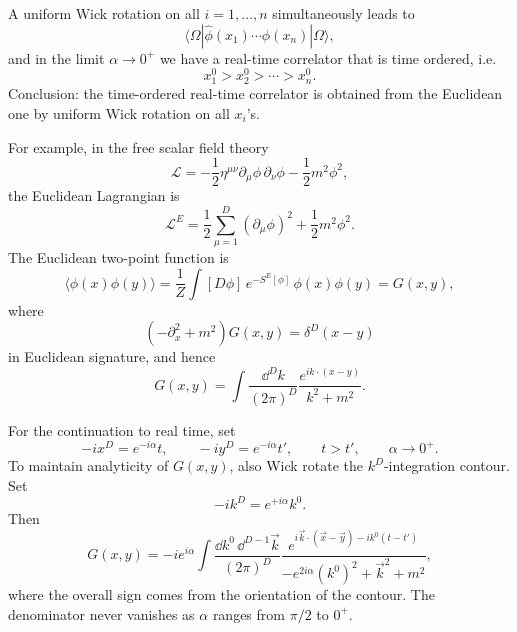 \begin{center}
\end{center}

A uniform Wick rotation on all \(i=1,\ldots,n\) simultaneously leads to
\[
  \langle\Omega|
  \hat\phi(x_1)\cdots\hat\phi(x_n)
  |\Omega\rangle,
\]
and in the limit \(\alpha\to0^+\) we have a real-time correlator that is
time ordered, i.e.
\[
  x_1^0>x_2^0>\cdots>x_n^0.
\]
Conclusion: the time-ordered real-time correlator is obtained from the
Euclidean one by uniform Wick rotation on all \(x_i\)'s.

For example, in the free scalar field theory
\[
  \mathcal L
  =
  -\frac12\eta^{\mu\nu}\partial_\mu\phi\,\partial_\nu\phi
  -\frac12m^2\phi^2,
\]
the Euclidean Lagrangian is
\[
  \mathcal L^E
  =
  \frac12\sum_{\mu=1}^D(\partial_\mu\phi)^2
  +\frac12m^2\phi^2.
\]
The Euclidean two-point function is
\[
  \langle\phi(x)\phi(y)\rangle
  =
  \frac{1}{Z}
  \int [D\phi]\,
  e^{-S^E[\phi]}\,
  \phi(x)\phi(y)
  =
  G(x,y),
\]
where
\[
  (-\partial_x^2+m^2)G(x,y)=\delta^D(x-y)
\]
in Euclidean signature, and hence
\[
  G(x,y)
  =
  \int\frac{\dd^D k}{(2\pi)^D}
  \frac{e^{ik\cdot(x-y)}}{k^2+m^2}.
\]

For the continuation to real time, set
\[
  -i x^D=e^{-i\alpha}t,
  \qquad
  -i y^D=e^{-i\alpha}t',
  \qquad
  t>t',
  \qquad
  \alpha\to0^+.
\]
To maintain analyticity of \(G(x,y)\), also Wick rotate the
\(k^D\)-integration contour. Set
\[
  -ik^D=e^{+i\alpha}k^0.
\]
Then
\[
  G(x,y)
  =
  -i e^{i\alpha}
  \int
  \frac{\dd k^0\,\dd^{D-1}\vec k}{(2\pi)^D}
  \frac{
    e^{i\vec k\cdot(\vec x-\vec y)-ik^0(t-t')}
  }{
    -e^{2i\alpha}(k^0)^2+\vec k^2+m^2
  },
\]
where the overall sign comes from the orientation of the contour. The
denominator never vanishes as \(\alpha\) ranges from \(\pi/2\) to \(0^+\).

